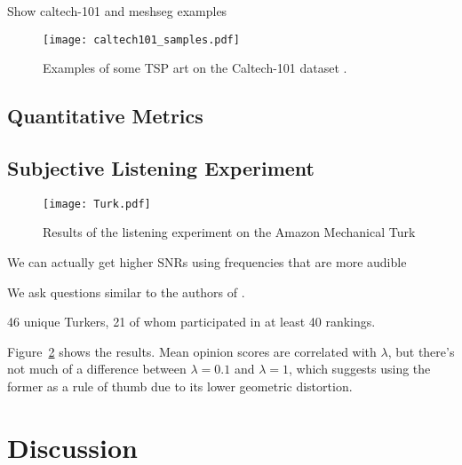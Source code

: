 \documentclass[runningheads]{llncs}
\begin{document}
Show caltech-101 and meshseg examples

\begin{figure}
  \centering
  \texttt{[image: caltech101\_samples.pdf]}
  \caption{Examples of some TSP art on the Caltech-101 dataset \cite{li_andreeto_ranzato_perona_2022}.}
  \label{fig:caltech101examples}
\end{figure}

\subsection{Quantitative Metrics}

\subsection{Subjective Listening Experiment}

\begin{figure}
  \centering
  \texttt{[image: Turk.pdf]}
  \caption{Results of the listening experiment on the Amazon Mechanical Turk}
  \label{fig:TurkResults}
\end{figure}


We can actually get higher SNRs using frequencies that are more audible

We ask questions similar to the authors of \cite{bassia2001robust}.

46 unique Turkers, 21 of whom participated in at least 40 rankings.

Figure~\ref{fig:TurkResults} shows the results.  Mean opinion scores are correlated with $\lambda$, but there's not much of a difference between $\lambda=0.1$ and $\lambda=1$, which suggests using the former as a rule of thumb due to its lower geometric distortion.

\section{Discussion}

%
%
%


%
\end{document}
